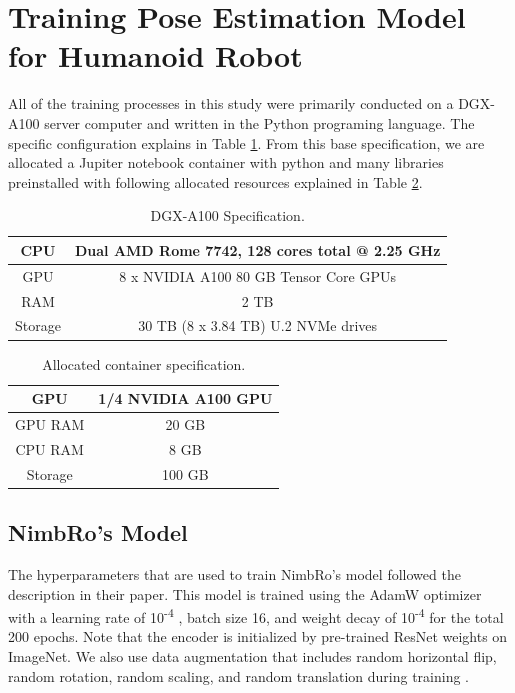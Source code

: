 \section{Training Pose Estimation Model for Humanoid Robot}
\label{sec:trainingrobot}

All of the training processes in this study were primarily conducted on a DGX-A100 server computer and written in the Python programing language. The specific configuration explains in Table \ref{tb:dgxa100}.
From this base specification, we are allocated a Jupiter notebook container with
python and many libraries preinstalled with following allocated resources explained in Table \ref{tb:allocatedcontainer}.

\begin{longtable}{|c|c|}
  \caption{DGX-A100 Specification.}
  \label{tb:dgxa100}\\
  \hline
  CPU     & Dual AMD Rome 7742, 128 cores total @ 2.25 GHz \\
  \hline
  GPU     & 8 x NVIDIA A100 80 GB Tensor Core GPUs  \\
  \hline
  RAM     & 2 TB \\
  \hline
  Storage & 30 TB (8 x 3.84 TB) U.2 NVMe drives \\
  \hline
\end{longtable}

\begin{longtable}{|c|c|}
  \caption{Allocated container specification.}
  \label{tb:allocatedcontainer}\\
  \hline
  GPU     & 1/4 NVIDIA A100 GPU \\
  \hline
  GPU RAM & 20 GB  \\
  \hline
  CPU RAM & 8 GB \\
  \hline
  Storage & 100 GB  \\
  \hline
\end{longtable}

\subsection{NimbRo's Model}
\label{subsec:trainingnimbromodel}

The hyperparameters that are used to train NimbRo's model followed the description in their paper.
This model is trained using the AdamW optimizer with a learning rate of 10\textsuperscript{-4} ,
batch size 16, and weight decay of 10\textsuperscript{-4} for the total 200 epochs.
Note that the encoder is initialized by pre-trained ResNet weights on ImageNet.
We also use data augmentation that includes random horizontal flip, random
rotation, random scaling, and random translation during training \parencite{amini2021}.


